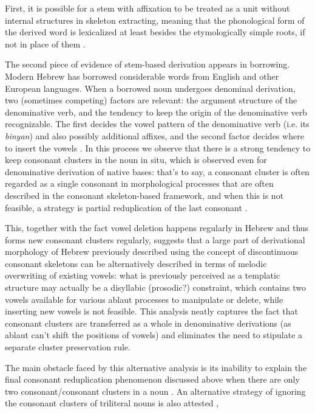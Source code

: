 \documentclass[a4paper, oneside, 12pt]{report}
\newcommand*{\citepage}[1]{p.~{#1}}
\newcommand*{\citepages}[1]{pp.~{#1}}
\newcommand{\form}[1]{\emph{#1}}
\begin{document}
First, it is possible for a stem with affixation to be treated as
a unit without internal structures in skeleton extracting,
meaning that the phonological form of the derived word is lexicalized
at least besides the etymologically simple roots, 
if not in place of them \citep[\citepage{132}]{bolozky2008roots}.

The second piece of evidence of stem-based derivation appears in borrowing.
Modern Hebrew has borrowed considerable words from English and other European languages.
When a borrowed noun undergoes denominal derivation,
two (sometimes competing) factors are relevant:
the argument structure of the denominative verb,
and the tendency to keep the origin of the denominative verb recognizable.
The first decides the vowel pattern of the denominative verb 
(i.e. its \form{binyan}) and also possibly additional affixes,
and the second factor decides where to insert the vowels
\citep[\citepages{133-134}]{bolozky2008roots}.
In this process we observe that there is a strong tendency to 
keep consonant clusters in the noun in situ,
which is observed even for denominative derivation of native bases:
that's to say, a consonant cluster is often regarded as a single consonant
in morphological processes that are often described in the consonant skeleton-based framework,
and when this is not feasible,
a strategy is partial reduplication of the last consonant
\citep[\citepages{134-135}]{bolozky2008roots}.

This, together with the fact vowel deletion happens regularly in Hebrew
and thus forms new consonant clusters regularly,
suggests that a large part of derivational morphology of Hebrew 
previously described using the concept of discontinuous consonant skeletons
can be alternatively described in terms of melodic overwriting of existing vowels:
what is previously perceived as a templatic structure 
may actually be a disyllabic (prosodic?) constraint,
which contains two vowels available for various ablaut processes to manipulate or delete,
while inserting new vowels is not feasible.
This analysis neatly captures the fact that consonant clusters are transferred as a whole
in denominative derivations (as ablaut can't shift the positions of vowels)
and eliminates the need to stipulate a separate cluster preservation rule.

The main obstacle faced by this alternative analysis
is its inability to explain the final consonant reduplication phenomenon
discussed above when there are only two consonant/consonant clusters in a noun
\citep[\citepage{136}]{bolozky2008roots}.
An alternative strategy of ignoring the consonant clusters of triliteral nouns is also attested
\citep[\citepages{139-140}]{bolozky2008roots},
\end{document}
